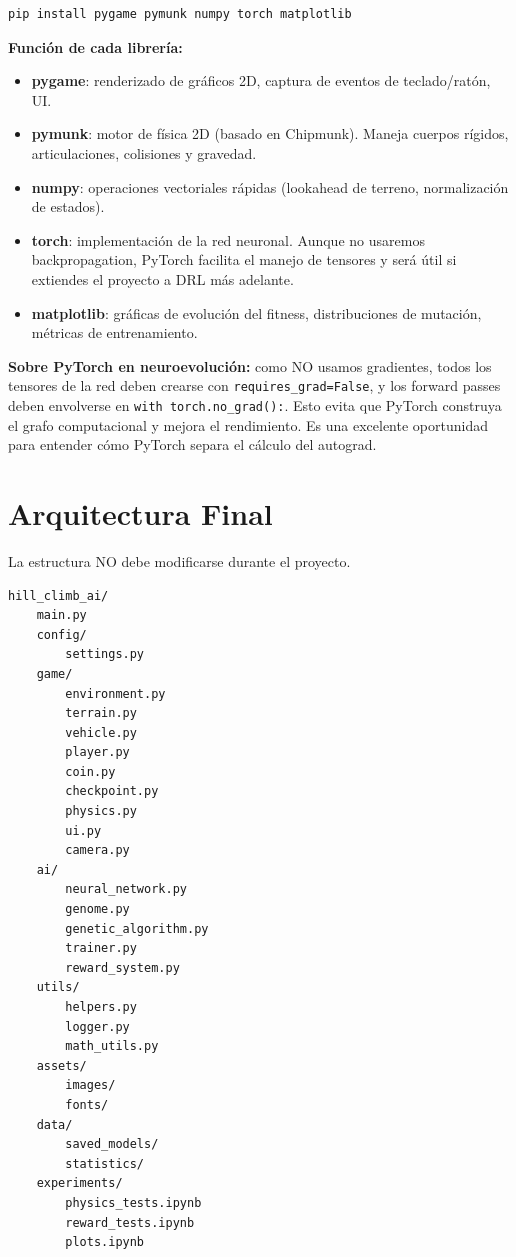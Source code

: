 \documentclass[11pt,a4paper]{article}
\begin{document}
\begin{lstlisting}[language=bash]
pip install pygame pymunk numpy torch matplotlib
\end{lstlisting}

\noindent\textbf{Función de cada librería:}

\begin{itemize}[leftmargin=*]
    \item \textbf{pygame}: renderizado de gráficos 2D, captura de eventos de teclado/ratón, UI.
    \item \textbf{pymunk}: motor de física 2D (basado en Chipmunk). Maneja cuerpos rígidos, articulaciones, colisiones y gravedad.
    \item \textbf{numpy}: operaciones vectoriales rápidas (lookahead de terreno, normalización de estados).
    \item \textbf{torch}: implementación de la red neuronal. Aunque no usaremos backpropagation, PyTorch facilita el manejo de tensores y será útil si extiendes el proyecto a DRL más adelante.
    \item \textbf{matplotlib}: gráficas de evolución del fitness, distribuciones de mutación, métricas de entrenamiento.
\end{itemize}

\begin{notabox}
\textbf{Sobre PyTorch en neuroevolución:} como NO usamos gradientes, todos los tensores de la red deben crearse con \texttt{requires\_grad=False}, y los forward passes deben envolverse en \texttt{with torch.no\_grad():}. Esto evita que PyTorch construya el grafo computacional y mejora el rendimiento. Es una excelente oportunidad para entender cómo PyTorch separa el cálculo del autograd.
\end{notabox}

\section{Arquitectura Final}

La estructura NO debe modificarse durante el proyecto.

\begin{lstlisting}[language=bash]
hill_climb_ai/
    main.py
    config/
        settings.py
    game/
        environment.py
        terrain.py
        vehicle.py
        player.py
        coin.py
        checkpoint.py
        physics.py
        ui.py
        camera.py
    ai/
        neural_network.py
        genome.py
        genetic_algorithm.py
        trainer.py
        reward_system.py
    utils/
        helpers.py
        logger.py
        math_utils.py
    assets/
        images/
        fonts/
    data/
        saved_models/
        statistics/
    experiments/
        physics_tests.ipynb
        reward_tests.ipynb
        plots.ipynb
\end{lstlisting}
\end{document}
